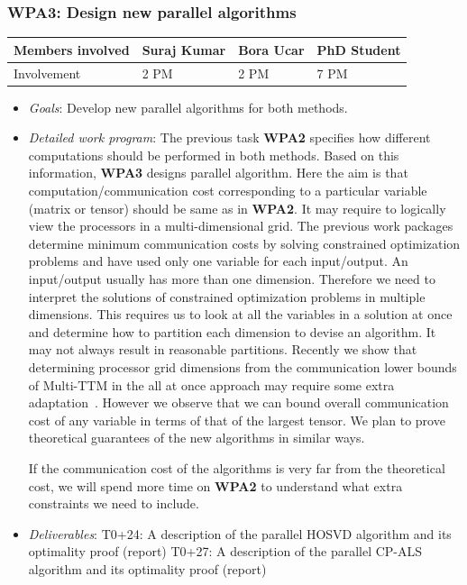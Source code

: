 \documentclass[a4paper,11pt]{article}
\newcommand{\subtask}[1]{{\color{orange}\paragraph{#1}$ $}}
\newcommand{\goal}{{\color{orange2}  \emph{Goals}:} }
\newcommand{\dwp}{{\color{orange2}  \emph{Detailed work program}: }}
\newcommand{\deliverables}{{\color{orange2}  \emph{Deliverables}: }}
\begin{document}
	\subsubsection{\textbf{WPA3}: Design new parallel algorithms}
	\vspace*{-0.375cm}\begin{table}[H]
		\begin{tabular}{llll}
			\hline
			\cellcolor{blue2}
			Members involved & Suraj Kumar& Bora Ucar & PhD Student \\
			\hline
			\cellcolor{orange2}
			Involvement      & 2 PM            & 2 PM & 7 PM \\
			\hline
		\end{tabular}
	\end{table}\vspace*{-0.25cm}
	\begin{itemize}[leftmargin=-1pt]
		\item[] \goal Develop new parallel algorithms for both methods.
		\item[] \dwp The previous task \textbf{WPA2} specifies how different computations should be performed in both methods. Based on this information, \textbf{WPA3} designs parallel algorithm. Here the aim is that computation/communication cost corresponding to a particular variable (matrix or tensor) should be same as in \textbf{WPA2}. It may require to logically view the processors in a multi-dimensional grid. The previous work packages determine minimum communication costs by solving constrained optimization problems and have used only one variable for each input/output. An input/output usually has more than one dimension. Therefore we need to interpret the solutions of constrained optimization problems in multiple dimensions. This requires us to look at all the variables in a solution at once and determine how to partition each dimension to devise an algorithm. It may not always result in reasonable partitions. Recently we show that determining processor grid dimensions from the communication lower bounds of Multi-TTM in the all at once approach may require some extra adaptation~\cite{ABGKR-SIMAX-2024}. However we observe that we can bound overall communication cost of any variable in terms of that of the largest tensor. We plan to prove theoretical guarantees of the new algorithms in similar ways.
		
		If the communication cost of the algorithms is very far from the theoretical cost, we will spend more time on \textbf{WPA2} to understand what extra constraints we need to include. 
		\item[] \deliverables T0+24: A description of the parallel HOSVD algorithm and its optimality proof (report)
		T0+27: A description of the parallel CP-ALS algorithm and its optimality proof (report) 
	\end{itemize}
	
\end{document}

